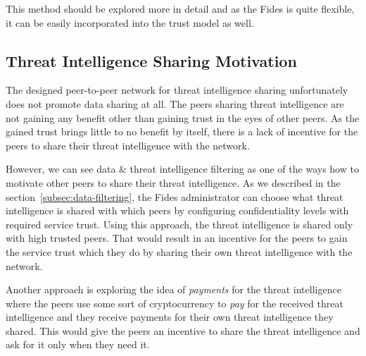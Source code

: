 This method should be explored more in detail and as the Fides is quite flexible, it can be easily incorporated into the trust model as well.

\subsection{Threat Intelligence Sharing Motivation}
\label{subsec:threat-intelligence-sharing-motivation}
The designed peer-to-peer network for threat intelligence sharing unfortunately does not promote data sharing at all.
The peers sharing threat intelligence are not gaining any benefit other than gaining trust in the eyes of other peers.
As the gained trust brings little to no benefit by itself, there is a lack of incentive for the peers to share their threat intelligence with the network.

However, we can see data \& threat intelligence filtering as one of the ways how to motivate other peers to share their threat intelligence.
As we described in the section~\ref{subsec:data-filtering}, the Fides administrator can choose what threat intelligence is shared with which peers by configuring confidentiality levels with required service trust.
Using this approach, the threat intelligence is shared only with high trusted peers.
That would result in an incentive for the peers to gain the service trust which they do by sharing their own threat intelligence with the network.

Another approach is exploring the idea of \textit{payments} for the threat intelligence where the peers use some sort of cryptocurrency to \textit{pay} for the received threat intelligence and they receive payments for their own threat intelligence they shared.
This would give the peers an incentive to share the threat intelligence and ask for it only when they need it.